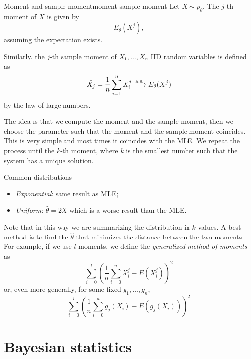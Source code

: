 \documentclass[12pt]{extarticle}
\newcommand{\convas}{\xrightarrow{\operatorfont a.s.}}
\begin{document}
\begin{definition}{Moment and sample moment}{moment-sample-moment}
    Let $X \sim p_\theta$. The $j$-th moment of $X$ is given by
    \begin{equation}
        E_\theta(X^j),
    \end{equation}
    assuming the expectation exists.

    Similarly, the $j$-th sample moment of $X_1,\dots, X_n$ IID random variables is defined as
    \begin{equation}
        \bar{X_j} = \frac{1}{n} \sum_{i = 1}^n X_i^j \convas E_\theta(X^j)
    \end{equation}
    by the law of large numbers.
\end{definition}

The idea is that we compute the moment and the sample moment, then we choose the parameter such that the moment and the sample moment coincides.
This is very simple and most times it coincides with the MLE.
We repeat the process until the $k$-th moment, where $k$ is the smallest number such that the system has a unique solution.

\begin{example}{Common distributions}{}
    \begin{itemize}
        \item \emph{Exponential}: same result as MLE;
        \item \emph{Uniform}: $\hat \theta = 2 \bar X$ which is a worse result than the MLE.
    \end{itemize}
\end{example}

Note that in this way we are summarizing the distribution in $k$ values. A best method is to find the $\hat \theta$ that minimizes the distance between the two moments.
For example, if we use $l$ moments, we define the \emph{generalized method of moments} as
\begin{equation}
    \sum_{i = 0}^l \left( \frac{1}{n} \sum_{i = 0}^n X^j_i - E(X_i^j) \right)^2
\end{equation}
or, even more generally, for some fixed $g_1, \dots, g_n$,
\begin{equation}
    \sum_{i = 0}^l \left( \frac{1}{n} \sum_{i = 0}^n g_j(X_i) - E(g_j(X_i)) \right)^2
\end{equation}

\section{Bayesian statistics}
\end{document}
